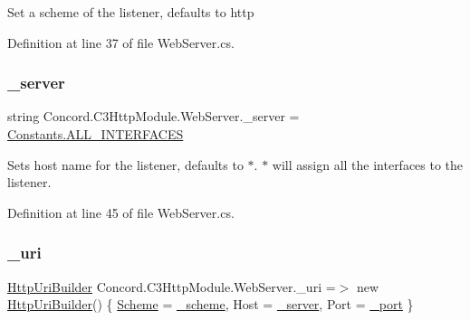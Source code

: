 Set a scheme of the listener, defaults to http 



Definition at line 37 of file Web\+Server.\+cs.

\mbox{\label{class_concord_1_1_c3_http_module_1_1_web_server_aac6507ed60e7bf9ac62740a84a4b1c70}} 
\subsubsection{\texorpdfstring{\_server}{\_server}}
{\footnotesize\ttfamily string Concord.\+C3\+Http\+Module.\+Web\+Server.\+\_\+server = \mbox{\hyperlink{class_concord_1_1_c3_http_module_1_1_constants_a3fe72e8bc32c96064538c8af8199c478}{Constants.\+A\+L\+L\+\_\+\+I\+N\+T\+E\+R\+F\+A\+C\+ES}}\hspace{0.3cm}{\ttfamily [private]}}



Sets host name for the listener, defaults to $\ast$. $\ast$ will assign all the interfaces to the listener. 



Definition at line 45 of file Web\+Server.\+cs.

\mbox{\label{class_concord_1_1_c3_http_module_1_1_web_server_a9f3645e16eef4385e06108fbb0b3ad7a}} 
\subsubsection{\texorpdfstring{\_uri}{\_uri}}
{\footnotesize\ttfamily \mbox{\hyperlink{class_concord_1_1_c3_http_module_1_1_http_uri_builder}{Http\+Uri\+Builder}} Concord.\+C3\+Http\+Module.\+Web\+Server.\+\_\+uri =$>$ new \mbox{\hyperlink{class_concord_1_1_c3_http_module_1_1_http_uri_builder}{Http\+Uri\+Builder}}() \{ \mbox{\hyperlink{class_concord_1_1_c3_http_module_1_1_web_server_a372194bcca0a119f079abe7f767dee71}{Scheme}} = \mbox{\hyperlink{class_concord_1_1_c3_http_module_1_1_web_server_a1d7bbb290d534e300796f0cc3024ca53}{\+\_\+scheme}}, Host = \mbox{\hyperlink{class_concord_1_1_c3_http_module_1_1_web_server_aac6507ed60e7bf9ac62740a84a4b1c70}{\+\_\+server}}, Port = \mbox{\hyperlink{class_concord_1_1_c3_http_module_1_1_web_server_a2f1c06a69c766d913ac41c4e8a7a2c1b}{\+\_\+port}} \}\hspace{0.3cm}{\ttfamily [private]}}



